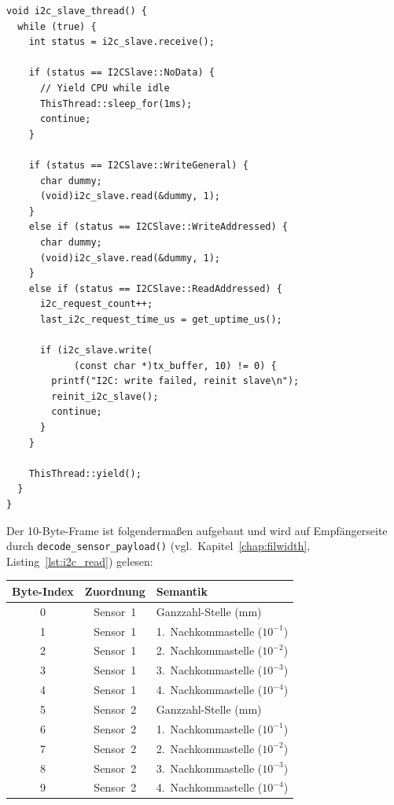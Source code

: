 \begin{lstlisting}[style=firmwarestyle, caption={I\textsuperscript{2}C-Slave-Thread (\texttt{i2c\_slave\_thread}, Z.~247--291).}, label={lst:sensor_i2c_slave}]
void i2c_slave_thread() {
  while (true) {
    int status = i2c_slave.receive();

    if (status == I2CSlave::NoData) {
      // Yield CPU while idle
      ThisThread::sleep_for(1ms);
      continue;
    }

    if (status == I2CSlave::WriteGeneral) {
      char dummy;
      (void)i2c_slave.read(&dummy, 1);
    }
    else if (status == I2CSlave::WriteAddressed) {
      char dummy;
      (void)i2c_slave.read(&dummy, 1);
    }
    else if (status == I2CSlave::ReadAddressed) {
      i2c_request_count++;
      last_i2c_request_time_us = get_uptime_us();

      if (i2c_slave.write(
            (const char *)tx_buffer, 10) != 0) {
        printf("I2C: write failed, reinit slave\n");
        reinit_i2c_slave();
        continue;
      }
    }

    ThisThread::yield();
  }
}
\end{lstlisting}


Der 10-Byte-Frame ist folgendermaßen aufgebaut und wird auf Empfängerseite durch \texttt{decode\_sensor\_payload()} (vgl.\ Kapitel~\ref{chap:filwidth}, Listing~\ref{lst:i2c_read}) gelesen:

\begin{center}
  \begin{tabular}{c c l}
    \toprule
    Byte-Index & Zuordnung & Semantik \\
    \midrule
    0 & Sensor~1 & Ganzzahl-Stelle (mm) \\
    1 & Sensor~1 & 1.\ Nachkommastelle ($10^{-1}$) \\
    2 & Sensor~1 & 2.\ Nachkommastelle ($10^{-2}$) \\
    3 & Sensor~1 & 3.\ Nachkommastelle ($10^{-3}$) \\
    4 & Sensor~1 & 4.\ Nachkommastelle ($10^{-4}$) \\
    5 & Sensor~2 & Ganzzahl-Stelle (mm) \\
    6 & Sensor~2 & 1.\ Nachkommastelle ($10^{-1}$) \\
    7 & Sensor~2 & 2.\ Nachkommastelle ($10^{-2}$) \\
    8 & Sensor~2 & 3.\ Nachkommastelle ($10^{-3}$) \\
    9 & Sensor~2 & 4.\ Nachkommastelle ($10^{-4}$) \\
    \bottomrule
  \end{tabular}
\end{center}

